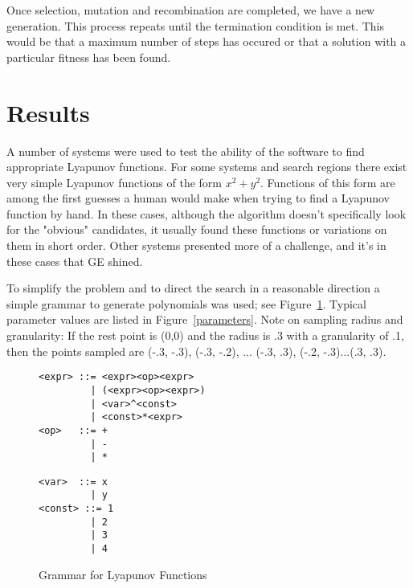 \documentclass[12pt]{article}
\begin{document}
Once selection, mutation and recombination are completed, we have a
new generation.  This process repeats until the termination condition
is met.  This would be that a maximum number of steps has occured or
that a solution with a particular fitness has been found. 

\section{Results}

A number of systems were used to test the ability of the software to find 
appropriate Lyapunov functions. For some systems and search regions there 
exist very simple Lyapunov functions of the form $x^2 + y^2$. Functions of 
this form are among the first guesses a human would make when trying to find 
a Lyapunov function by hand. In these cases, although the algorithm doesn't
specifically look for the "obvious" candidates, it usually found these functions
 or variations on them in short order. Other systems 
presented more of a challenge, and it's in these cases that GE shined. 


To simplify the problem and to direct the search in a reasonable
direction a simple grammar to generate polynomials was used; see
Figure~\ref{minigrammar}. Typical parameter values are listed in
Figure~\ref{parameters}.  Note on sampling radius and granularity: If
the rest point is (0,0) and the radius is .3 with a granularity of .1,
then the points sampled are (-.3, -.3), (-.3, -.2), ... (-.3, .3),
(-.2, -.3)...(.3, .3).  

\begin{figure}[tbh]
{\color{blue}
\hspace*{0.15\textwidth}
\begin{minipage}{0.41\textwidth}
{\footnotesize
\begin{verbatim}
<expr> ::= <expr><op><expr>
         | (<expr><op><expr>)
         | <var>^<const>
         | <const>*<expr>
<op>   ::= +
         | -
         | *
\end{verbatim}
}
\end{minipage}
\hspace*{0.05\textwidth}
\begin{minipage}{0.3\textwidth}
{\footnotesize
\begin{verbatim}
<var>  ::= x
         | y
<const> ::= 1
         | 2
         | 3
         | 4
\end{verbatim}
}
\end{minipage}
}
\caption{\label{minigrammar} Grammar for Lyapunov Functions}
\end{figure}
\end{document}
